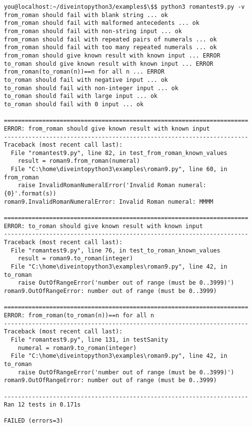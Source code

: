 \noindent\begin{minipage}{\textwidth}
\begin{lstlisting}[mathescape=True]
you@localhost:~/diveintopython3/examples$\$$ python3 romantest9.py -v
from_roman should fail with blank string ... ok
from_roman should fail with malformed antecedents ... ok
from_roman should fail with non-string input ... ok
from_roman should fail with repeated pairs of numerals ... ok
from_roman should fail with too many repeated numerals ... ok
from_roman should give known result with known input ... ERROR
to_roman should give known result with known input ... ERROR
from_roman(to_roman(n))==n for all n ... ERROR
to_roman should fail with negative input ... ok
to_roman should fail with non-integer input ... ok
to_roman should fail with large input ... ok
to_roman should fail with 0 input ... ok

======================================================================
ERROR: from_roman should give known result with known input
----------------------------------------------------------------------
Traceback (most recent call last):
  File "romantest9.py", line 82, in test_from_roman_known_values
    result = roman9.from_roman(numeral)
  File "C:\home\diveintopython3\examples\roman9.py", line 60, in from_roman
    raise InvalidRomanNumeralError('Invalid Roman numeral: {0}'.format(s))
roman9.InvalidRomanNumeralError: Invalid Roman numeral: MMMM

======================================================================
ERROR: to_roman should give known result with known input
----------------------------------------------------------------------
Traceback (most recent call last):
  File "romantest9.py", line 76, in test_to_roman_known_values
    result = roman9.to_roman(integer)
  File "C:\home\diveintopython3\examples\roman9.py", line 42, in to_roman
    raise OutOfRangeError('number out of range (must be 0..3999)')
roman9.OutOfRangeError: number out of range (must be 0..3999)

======================================================================
ERROR: from_roman(to_roman(n))==n for all n
----------------------------------------------------------------------
Traceback (most recent call last):
  File "romantest9.py", line 131, in testSanity
    numeral = roman9.to_roman(integer)
  File "C:\home\diveintopython3\examples\roman9.py", line 42, in to_roman
    raise OutOfRangeError('number out of range (must be 0..3999)')
roman9.OutOfRangeError: number out of range (must be 0..3999)

----------------------------------------------------------------------
Ran 12 tests in 0.171s

FAILED (errors=3)
\end{lstlisting}
\end{minipage}

